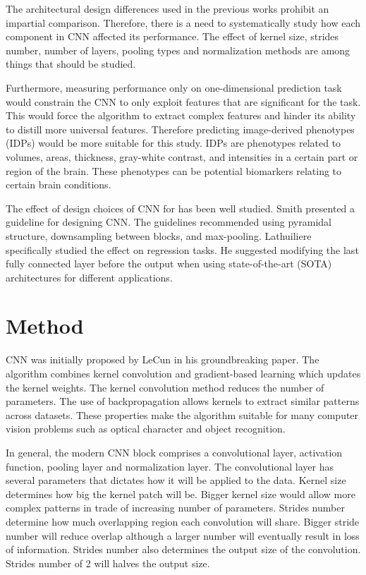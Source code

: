 \documentclass{article}
\begin{document}
    The architectural design differences used in the previous works prohibit an impartial comparison. 
    Therefore, there is a need to systematically study how each component in CNN affected its performance. 
    The effect of kernel size, strides number, number of layers, pooling types and normalization methods are among things that should be studied.

    Furthermore, measuring performance only on one-dimensional prediction task would constrain the CNN to only exploit features that are significant for the task. 
    This would force the algorithm to extract complex features and hinder its ability to distill more universal features. 
    Therefore predicting image-derived phenotypes (IDPs) would be more suitable for this study. 
    IDPs are phenotypes related to volumes, areas, thickness, gray-white contrast, and intensities in a certain part or region of the brain. 
    These phenotypes can be potential biomarkers relating to certain brain conditions. 
    
    The effect of design choices of CNN for has been well studied. 
    Smith\cite{smith} presented a guideline for designing CNN. 
    The guidelines recommended using pyramidal structure, downsampling between blocks, and max-pooling. 
    Lathuiliere\cite{lath} specifically studied the effect on regression tasks. 
    He suggested modifying the last fully connected layer before the output when using state-of-the-art (SOTA) architectures for different applications.
    

    \section*{Method}
    CNN was initially proposed by LeCun\cite{lecun} in his groundbreaking paper. 
    The algorithm combines kernel convolution and gradient-based learning which updates the kernel weights. 
    The kernel convolution method reduces the number of parameters. 
    The use of backpropagation allows kernels to extract similar patterns across datasets. 
    These properties make the algorithm suitable for many computer vision problems such as optical character and object recognition.

    In general, the modern CNN block comprises a convolutional layer, activation function, pooling layer and normalization layer. 
    The convolutional layer has several parameters that dictates how it will be applied to the data. 
    Kernel size determines how big the kernel patch will be. 
    Bigger kernel size would allow more complex patterns in trade of increasing number of parameters. 
    Strides number determine how much overlapping region each convolution will share. 
    Bigger stride number will reduce overlap although a larger number will eventually result in loss of information. 
    Strides number also determines the output size of the convolution. 
    Strides number of 2 will halves the output size.
\end{document}
